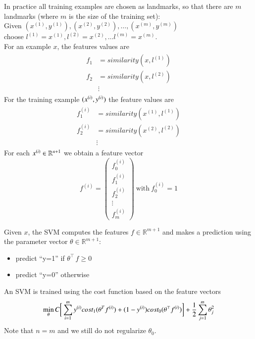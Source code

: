 \documentclass[a4paper,twoside,10pt]{article}
\begin{document}
In practice all training examples are chosen as landmarks, so that there are $m$ landmarks (where $m$ is the size of the training set):\\
Given $(x^{(1)},y^{(1)}),(x^{(2)},y^{(2)}),\ldots,(x^{(m)},y^{(m)})$\\
choose $l^{(1)}=x^{(1)},l^{(2)}=x^{(2)},\ldots l^{(m)}=x^{(m)}$.\\
For an example $x$, the features values are
\begin{align*}
  \begin{split}
    f_1&=similarity(x,l^{(1)})\\
    f_2&=similarity(x,l^{(2)})\\
    &\vdots
  \end{split}
\end{align*}
For the training example $(x^{(i)},y^{(i)})$ the feature values are
\begin{align*}
  \begin{split}
    f^{(i)}_1&=similarity(x^{(1)},l^{(1)})\\
    f^{(i)}_2&=similarity(x^{(2)},l^{(2)})\\
    &\vdots
  \end{split}
\end{align*}
For each $x^{(i)}\in\mathbb{R}^{n+1}$ we obtain a feature vector
\begin{equation*}
  f^{(i)}=\begin{pmatrix}f^{(i)}_0\\f^{(i)}_1\\f^{(i)}_2\\\vdots\\f^{(i)}_m\end{pmatrix}
    \mathrm{\ with\ }f^{(i)}_0=1
\end{equation*}

Given $x$, the \ac{SVM} computes the features $f\in\mathbb{R}^{m+1}$ and makes a prediction using the parameter vector $\theta\in\mathbb{R}^{m+1}$:
\begin{itemize}
  \item predict ``y=1'' if $\theta^\top\,f\ge 0$
  \item predict ``y=0'' otherwise
\end{itemize}
\newcommand{\sfi}{\ensuremath{f^{(i)}}}
\newcommand{\sli}{\ensuremath{l^{(i)}}}
An \ac{SVM} is trained using the cost function based on the feature vectors
\begin{equation*}
  \mathop{\operatorname{min}}_\theta C\bigg[\sumi\syi cost_1(\theta^T\sfi)+(1-\syi)cost_0(\theta^\top\sfi)\bigg]+\frac{1}{2}\sum_{j=1}^m\theta_j^2
\end{equation*}
Note that $n=m$ and we still do not regularize $\theta_0$.
\end{document}
